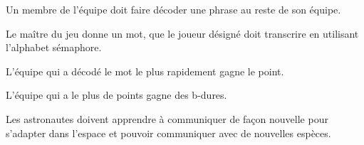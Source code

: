 \documentclass{grand-jeu}
\begin{document}
\begin{liste-materiel}
\end{liste-materiel}

\begin{regles}
Un membre de l’équipe doit faire décoder une phrase au reste de son équipe. 

Le maître du jeu donne un mot, que le joueur désigné doit transcrire en utilisant l’alphabet sémaphore. 

L’équipe qui a décodé le mot le plus rapidement gagne le point. 

L'équipe qui a le plus de points gagne des b-dures. 
\end{regles}

\begin{imaginaire}
Les astronautes doivent apprendre à communiquer de façon nouvelle pour s'adapter dans l'espace et pouvoir communiquer avec de nouvelles espèces.
\end{imaginaire}

\begin{moments-stop}
\end{moments-stop}
\end{document}
